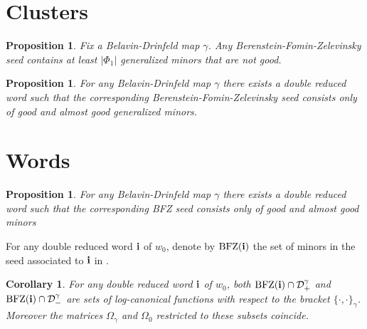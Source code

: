 \documentclass[a4paper]{amsart}
\newtheorem{proposition}[theorem]{Proposition}
\newtheorem{corollary}[theorem]{Corollary}
\theoremstyle{definition}
\begin{document}
\section{Clusters}

\begin{proposition}
  Fix a Belavin-Drinfeld map $\gamma$. 
  Any Berenstein-Fomin-Zelevinsky seed contains at least $|\Phi_1|$ generalized minors that are not good.
\end{proposition}

\begin{proposition}
  For any Belavin-Drinfeld map $\gamma$ there exists a double reduced word such that the corresponding Berenstein-Fomin-Zelevinsky seed consists only of good and almost good generalized minors.
\end{proposition}


\section{Words}
\begin{proposition}
  For any Belavin-Drinfeld map $\gamma$ there exists a double reduced word such that the corresponding BFZ seed consists only of good and almost good minors
\end{proposition}


For any double reduced word $\bf{i}$ of $w_0$, denote by $\operatorname{BFZ}(\bf{i})$ the set of minors in the seed associated to $\bf{i}$ in \cite{BFZ05}.

\begin{corollary}
  For any double reduced word $\bf{i}$ of $w_0$, both  $\operatorname{BFZ}(\bf{i})\cap\mathcal{D}^\gamma_+$ and $\operatorname{BFZ}(\bf{i})\cap\mathcal{D}^\gamma_-$ are sets of log-canonical functions with respect to the bracket $\{\cdot,\cdot\}_\gamma$.
  Moreover the matrices $\Omega_\gamma$ and $\Omega_0$ restricted to these subsets coincide.
\end{corollary}
\end{document}
